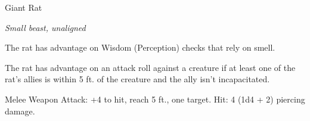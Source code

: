 \begin{monsterbox}{Giant Rat}
\begin{hangingpar}
\textit{Small beast, unaligned}
\end{hangingpar}
\dndline%
\basics[%
armorclass = 12,
hitpoints = 2d6,
speed = {30 ft.}
]
\dndline%
\stats[%
STR = \stat{7},
DEX = \stat{15},
CON = \stat{11},
INT = \stat{2},
WIS = \stat{10},
CHA = \stat{4}
]
\dndline%
\details[%
skills={},
damageimmunities={},
savingthrows={},
conditionimmunities={},
damageresistances={},
damagevulnerabilities={},
senses={darkvision 60 ft., passive Perception 10},
challenge=1/8
]
\dndline%
\begin{monsteraction}
The rat has advantage on Wisdom (Perception) checks that rely on smell.
\end{monsteraction}
\begin{monsteraction}
The rat has advantage on an attack roll against a creature if at least one of the rat's allies is within 5 ft. of the creature and the ally isn't incapacitated.
\end{monsteraction}
\begin{monsteraction}[Bite]
Melee Weapon Attack: +4 to hit, reach 5 ft., one target. Hit: 4 (1d4 + 2) piercing damage.
\end{monsteraction}
\end{monsterbox}